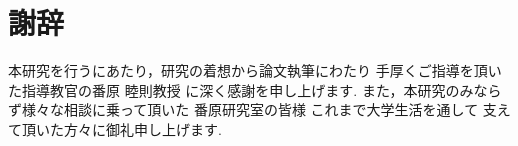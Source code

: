 \section*{謝辞}

本研究を行うにあたり，研究の着想から論文執筆にわたり
手厚くご指導を頂いた指導教官の番原 睦則教授
に深く感謝を申し上げます.
また，本研究のみならず様々な相談に乗って頂いた
番原研究室の皆様
これまで大学生活を通して
支えて頂いた方々に御礼申し上げます.

